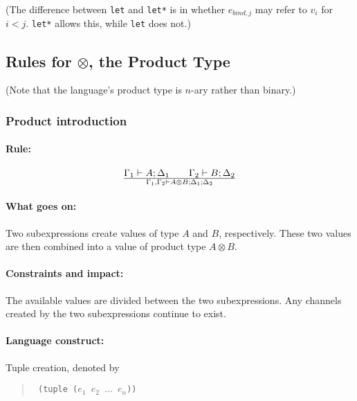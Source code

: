 \documentclass[a4paper]{article}
\begin{document}
(The difference between \texttt{let} and \texttt{let*} is in whether
$e_{bind,j}$ may refer to $v_i$ for $i<j$. \texttt{let*} allows this,
while \texttt{let} does not.)



\subsection{Rules for $\otimes$, the Product Type}

(Note that the language's product type is $n$-ary rather than binary.)

\subsubsection{Product introduction}
\paragraph{Rule:}
$$
{
 {\Gamma_1 \vdash A;\Delta_1}
 \qquad
 {\Gamma_2 \vdash B;\Delta_2}
}\over{
 \Gamma_1, \Gamma_2 \vdash A \otimes B ; \Delta_1 ; \Delta_2
}
$$

\paragraph{What goes on:} Two subexpressions create values of type $A$
and $B$, respectively. These two values are then combined into a value
of product type $A \otimes B$.


\paragraph{Constraints and impact:} The available values are divided
between the two subexpressions.  Any channels created
by the two subexpressions continue to exist.

\paragraph{Language construct:} Tuple creation, denoted by
\begin{quote}\tt
  (tuple ($e_1$ $e_2$ $\ldots$ $e_n$))
\end{quote}
\end{document}
